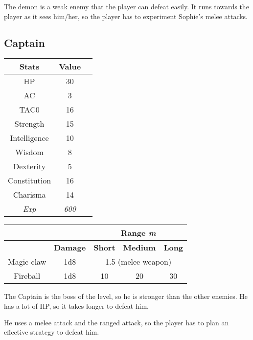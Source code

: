 The demon is a weak enemy that the player can defeat easily. It runs towards the player as it sees him/her, so the player has to experiment Sophie's melee attacks.

\subsection{Captain}
\begin{table}[H]
  \centering
\begin{tabular}{|c|c|c|}
\hline
\rowcolor[HTML]{C0C0C0}
\textbf{Stats} & \textbf{Value } \\ \hline
HP & 30  \\ \hline
AC & 3 \\ \hline
TAC0 & 16 \\ \hline
Strength & 15  \\ \hline
Intelligence & 10 \\ \hline
Wisdom & 8 \\ \hline
Dexterity & 5  \\ \hline
Constitution & 16 \\ \hline
Charisma & 14 \\ \hline
\textit{Exp} & \textit{600} \\ \hline
\end{tabular}
\end{table}
\begin{table}[H]
\centering
\begin{tabular}{ll|c|c|c|}
\cline{3-5}
 &  & \multicolumn{3}{c|}{\cellcolor[HTML]{C0C0C0}\textbf{Range \textit{m}}} \\ \hline
\rowcolor[HTML]{C0C0C0}
\multicolumn{1}{|l|}{\cellcolor[HTML]{C0C0C0}\textbf{Weapon}} & \textbf{Damage} &\multicolumn{1}{l|}{\cellcolor[HTML]{C0C0C0}\textbf{Short}} & \textbf{Medium} & \textbf{Long} \\ \hline
\multicolumn{1}{|c|}{Magic claw} & \multicolumn{1}{c|}{1d8} & \multicolumn{3}{c|}{1.5 (melee weapon)} \\ \hline
\multicolumn{1}{|c|}{Fireball} & \multicolumn{1}{c|}{1d8} & 10 & 20 & 30 \\ \hline
\end{tabular}
\end{table}

The Captain is the boss of the level, so he is stronger than the other enemies. He has a lot of HP, so it takes longer to defeat him.

He uses a melee attack and the ranged attack, so the player has to plan an effective strategy to defeat him.
